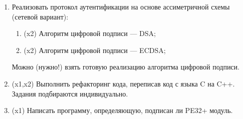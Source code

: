 \documentclass[a4paper]{article}
\begin{document}
\begin{enumerate}
\item Реализовать протокол аутентификации на основе ассиметричной схемы (сетевой вариант):
\begin{enumerate}
    \item (x2) Алгоритм цифровой подписи --- DSA;
    \item (x2) Алгоритм цифровой подписи --- ECDSA;
\end{enumerate}
Можно (нужно!) взять готовую реализацию алгоритма цифровой подписи.

\item (x1,x2) Выполнить рефакторинг кода, переписав код с языка C на C++. Задания подбираются индивидуально.

\item (x1) Написать программу, определяющую, подписан ли PE32+ модуль.

\end{enumerate}
\end{document}
